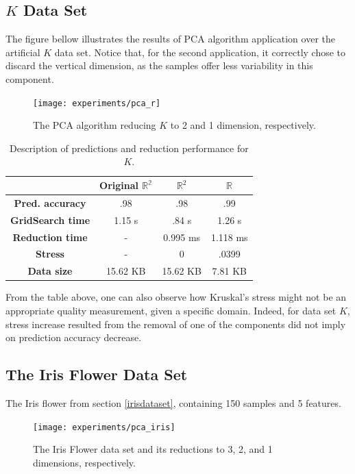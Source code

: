 \subsection{$K$ Data Set}

The figure bellow illustrates the results of PCA algorithm application over the artificial $K$ data set. Notice that, for the second application, it correctly chose to discard the vertical dimension, as the samples offer less variability in this component.

\begin{figure}[H]
	\centering
	\captionsetup{justification=centering}
	
	\texttt{[image: experiments/pca\_r]}
	\caption{The PCA algorithm reducing $K$ to 2 and 1 dimension, respectively.}
	\label{fig:datasetrpca}
\end{figure}

\begin{table}[H]
	\centering
	\begin{tabular}{|c|c|c|c|}
		\hline
		& \textbf{Original $\mathbb{R^2}$} & \textbf{$\mathbb{R}^2$} & \textbf{$\mathbb{R}$} \\\hline
		\textbf{Pred. accuracy} & .98 & .98 & .99 \\\hline
		\textbf{GridSearch time} & 1.15 s & .84 s & 1.26 s \\\hline
		\textbf{Reduction time} & - & 0.995 ms & 1.118 ms \\\hline
		\textbf{Stress} & - & 0 & .0399 \\\hline
		\textbf{Data size} & 15.62 KB & 15.62 KB & 7.81 KB \\\hline
	\end{tabular}
	\caption{Description of predictions and reduction performance for $K$.}
\end{table}

From the table above, one can also observe how Kruskal's stress might not be an appropriate quality measurement, given a specific domain. Indeed, for data set $K$, stress increase resulted from the removal of one of the components did not imply on prediction accuracy decrease.

\clearpage
\subsection{The Iris Flower Data Set}

The Iris flower from section \ref{irisdataset}, containing 150 samples and 5 features.

\begin{figure}[H]
	\centering
	\captionsetup{justification=centering}
	
	\texttt{[image: experiments/pca\_iris]}
	\caption{The Iris Flower data set and its reductions to 3, 2, and 1 dimensions, respectively.}
	\label{fig:dsirispca}
\end{figure}

